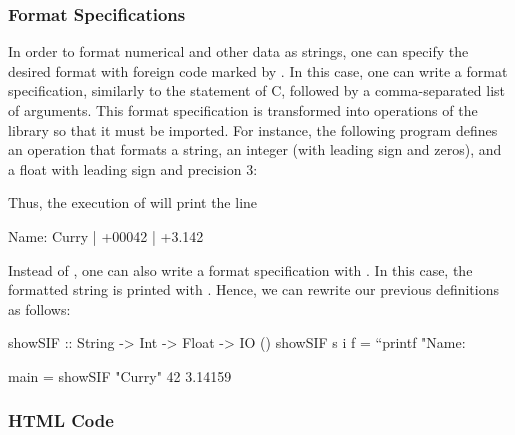 \subsubsection{Format Specifications}

In order to format numerical and other data as strings,
one can specify the desired format with foreign code marked by
. In this case, one can write a format specification,
similarly to the  statement of C,
followed by a comma-separated list of arguments.
This format specification is transformed into operations
of the \CYS library  so that it must be imported.
For instance, the following program defines an operation
that formats a string, an integer (with leading sign and zeros),
and a float with leading sign and precision 3:
Thus, the execution of  will print the line
\begin{curry}
Name: Curry | +00042 | +3.142
\end{curry}

Instead of , one can also write a format specification
with . In this case, the formatted string is
printed with . Hence, we can rewrite our previous definitions
as follows:
\begin{curry}
showSIF :: String -> Int -> Float -> IO ()
showSIF s i f = ``printf "Name: %

main = showSIF "Curry" 42 3.14159
\end{curry}


\subsubsection{HTML Code}

